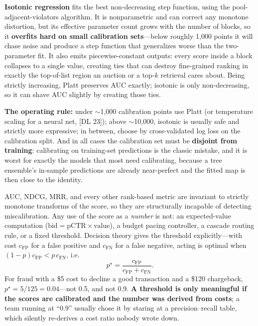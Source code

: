 \textbf{Isotonic regression} fits the best non-decreasing step function, using the pool-adjacent-violators algorithm. It is nonparametric and can correct any monotone distortion, but its effective parameter count grows with the number of blocks, so it \textbf{overfits hard on small calibration sets}---below roughly 1{,}000 points it will chase noise and produce a step function that generalizes worse than the two-parameter fit. It also emits piecewise-constant outputs: every score inside a block collapses to a single value, creating ties that can destroy fine-grained ranking in exactly the top-of-list region an auction or a top-$k$ retrieval cares about. Being strictly increasing, Platt preserves AUC exactly; isotonic is only non-decreasing, so it can shave AUC slightly by creating those ties.

\textbf{The operating rule:} under $\sim$1{,}000 calibration points use Platt (or temperature scaling for a neural net, [DL 23]); above $\sim$10{,}000, isotonic is usually safe and strictly more expressive; in between, choose by cross-validated log loss on the calibration split. And in all cases the calibration set must be \textbf{disjoint from training}: calibrating on training-set predictions is the classic mistake, and it is worst for exactly the models that most need calibrating, because a tree ensemble's in-sample predictions are already near-perfect and the fitted map is then close to the identity.

\begin{keyinsight}
AUC, NDCG, MRR, and every other rank-based metric are invariant to strictly monotone transforms of the score, so they are structurally incapable of detecting miscalibration. Any use of the score as a \textit{number} is not: an expected-value computation ($\text{bid} = \text{pCTR} \times \text{value}$), a budget pacing controller, a cascade routing rule, or a fixed threshold. Decision theory gives the threshold explicitly---with cost $c_{\text{FP}}$ for a false positive and $c_{\text{FN}}$ for a false negative, acting is optimal when $(1-p)c_{\text{FP}} < p\,c_{\text{FN}}$, i.e.
\begin{equation*}
p^\star = \frac{c_{\text{FP}}}{c_{\text{FP}} + c_{\text{FN}}} .
\end{equation*}
For fraud with a \$5 cost to decline a good transaction and a \$120 chargeback, $p^\star = 5/125 = 0.04$---not 0.5, and not 0.9. \textbf{A threshold is only meaningful if the scores are calibrated and the number was derived from costs}; a team running at ``0.9'' usually chose it by staring at a precision--recall table, which silently re-derives a cost ratio nobody wrote down.
\end{keyinsight}

